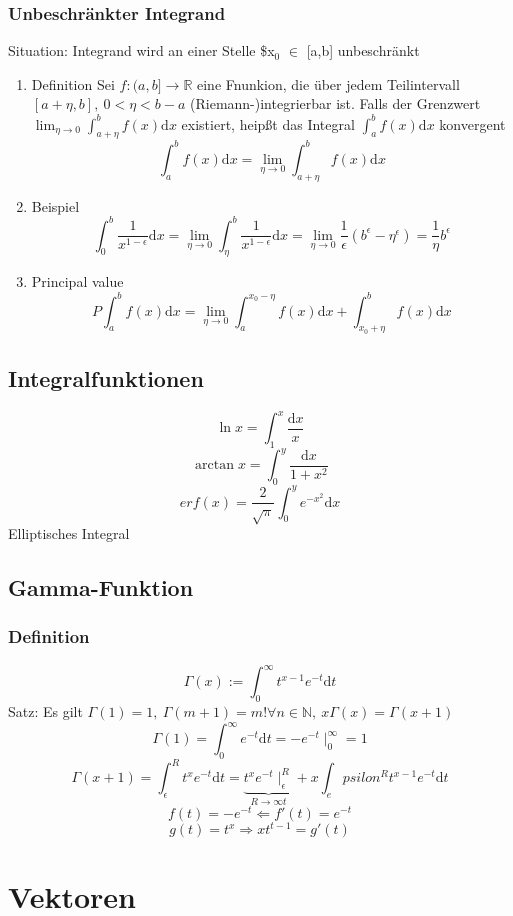 \documentclass[11pt]{article}
\DeclareMathOperator{\Forall}{\forall}
\begin{document}
\subsubsection{Unbeschränkter Integrand}
\label{sec-11-5-1}
Situation: Integrand wird an einer Stelle \$x$_{\text{0}}$ $\in$ [a,b] unbeschränkt
\begin{enumerate}
\item Definition
\label{sec-11-5-1-1}
Sei $f:(a,b] \to \mathbb{R}$ eine Fnunkion, die über jedem Teilintervall $[a+\eta, b],~0<\eta<b-a$ (Riemann-)integrierbar ist.
Falls der Grenzwert $\lim_{\eta\to 0}\int_{a+\eta}^b f(x)\mathrm{d}x$ existiert, heipßt das Integral $\int_a^b f(x)\mathrm{d}x$ konvergent
\[\int_a^b f(x)\mathrm{d}x = \lim_{\eta\to 0}\int_{a+\eta}^b f(x)\mathrm{d}x\]
\item Beispiel
\label{sec-11-5-1-2}
\[\int_0^b \frac{1}{x^{1-\epsilon}}\mathrm{d}x = \lim_{\eta\to 0} \int_\eta^b \frac{1}{x^{1-\epsilon}}\mathrm{d}x = \lim_{\eta\to 0} \frac{1}{\epsilon}(b^\epsilon - \eta^\epsilon) = \frac{1}{\eta}b^\epsilon\]
\item Principal value
\label{sec-11-5-1-3}
\[P\int_a^b f(x)\mathrm{d}x = \lim_{\eta\to 0} \int_a^{x_0 - \eta} f(x)\mathrm{d}x + \int_{x_0+\eta}^b f(x)\mathrm{d}x\]
\end{enumerate}
\subsection{Integralfunktionen}
\label{sec-11-6}
\[\ln{x} = \int_1^x \frac{\mathrm{d}x}{x}\]
\[\arctan{x} = \int_0^y \frac{\mathrm{d}x}{1+x^2}\]
\[erf(x) = \frac{2}{\sqrt{\pi}}\int_0^y e^{-x^2}\mathrm{d}x\]
Elliptisches Integral
\subsection{Gamma-Funktion}
\label{sec-11-7}
\subsubsection{Definition}
\label{sec-11-7-1}
\[\Gamma(x):=\int_0^\infty t^{x-1}e^{-t}\mathrm{d}t\]
Satz: Es gilt $\Gamma(1) = 1,~\Gamma(m+1) = m! \Forall n\in\mathbb{N},~x\Gamma(x) = \Gamma(x+1)$
\[\Gamma(1)=\int_0^\infty e^{-t}\mathrm{d}t=-e^{-t}\mid_0^\infty = 1\]
\[\Gamma(x+1) = \int_\epsilon^R t^x e^{-t}\mathrm{d}t = \underbrace{t^x e^{-t}\mid_\epsilon^R}_{R\to\infty t} + x\int_epsilon^R t^{x-1}e^{-t}\mathrm{d}t\]
\[f(t) = -e^{-t} \Leftarrow f'(t)=e^{-t}\]
\[g(t) = t^x \Rightarrow xt^{t-1} = g'(t)\]
\section{Vektoren}
\label{sec-12}
\end{document}
